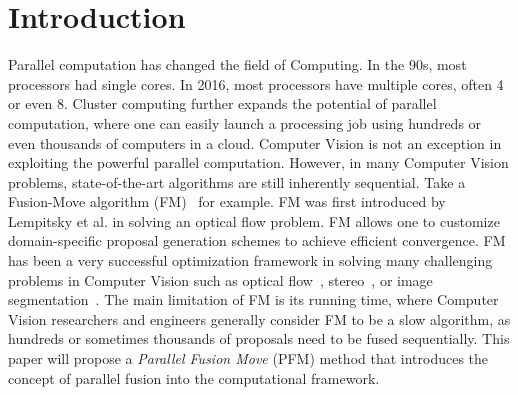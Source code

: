 \section{Introduction}
Parallel computation has changed the field of Computing.  In the 90s,
most processors had single cores. In 2016, most processors have multiple
cores, often 4 or even 8. Cluster computing further expands the
potential of parallel computation, where one can easily launch a
processing job using hundreds or even thousands of computers in a
cloud. Computer Vision is not an exception in exploiting the powerful
parallel computation. However, in many Computer Vision problems,
state-of-the-art algorithms are still inherently sequential. Take a
Fusion-Move algorithm (FM)~\cite{viktor,second_order_stereo,else} for
example. FM was first introduced by Lempitsky et al. in solving an
optical flow problem. FM allows one to customize domain-specific
proposal generation schemes to achieve efficient convergence. FM has
been a very successful optimization framework in solving many
challenging problems in Computer Vision such as optical
flow~\cite{viktor}, stereo~\cite{second_order_stereo}, or image
segmentation~\cite{some}. The main limitation of FM is its running time,
where Computer Vision researchers and engineers generally consider FM to
be a slow algorithm, as hundreds or sometimes thousands of proposals
need to be fused sequentially. This paper will propose a {\it Parallel
Fusion Move} (PFM) method that introduces the concept of parallel fusion
into the computational framework.

